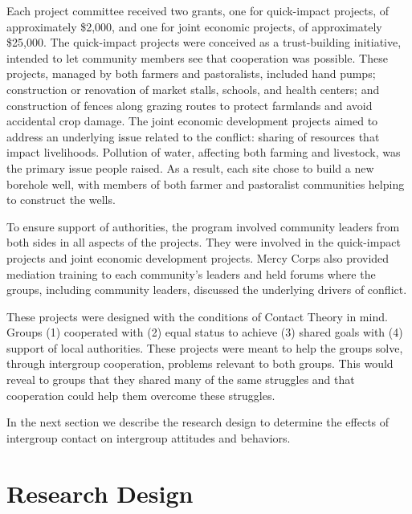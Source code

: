 \documentclass[11pt]{article}
\begin{document}
Each project committee received two grants, one for quick-impact
projects, of approximately \$2,000, and one for joint economic projects,
of approximately \$25,000. The quick-impact projects were conceived as a
trust-building initiative, intended to let community members see that
cooperation was possible. These projects, managed by both farmers and
pastoralists, included hand pumps; construction or renovation of market
stalls, schools, and health centers; and construction of fences along
grazing routes to protect farmlands and avoid accidental crop damage.
The joint economic development projects aimed to address an underlying
issue related to the conflict: sharing of resources that impact
livelihoods. Pollution of water, affecting both farming and livestock,
was the primary issue people raised. As a result, each site chose to
build a new borehole well, with members of both farmer and pastoralist
communities helping to construct the wells.

To ensure support of authorities, the program involved community leaders
from both sides in all aspects of the projects. They were involved in
the quick-impact projects and joint economic development projects. Mercy
Corps also provided mediation training to each community's leaders and
held forums where the groups, including community leaders, discussed the
underlying drivers of conflict.

These projects were designed with the conditions of Contact Theory in
mind. Groups (1) cooperated with (2) equal status to achieve (3) shared
goals with (4) support of local authorities. These projects were meant
to help the groups solve, through intergroup cooperation, problems
relevant to both groups. This would reveal to groups that they shared
many of the same struggles and that cooperation could help them overcome
these struggles.

In the next section we describe the research design to determine the
effects of intergroup contact on intergroup attitudes and behaviors.

\hypertarget{research-design}{%
\section{Research Design}\label{research-design}}
\end{document}

